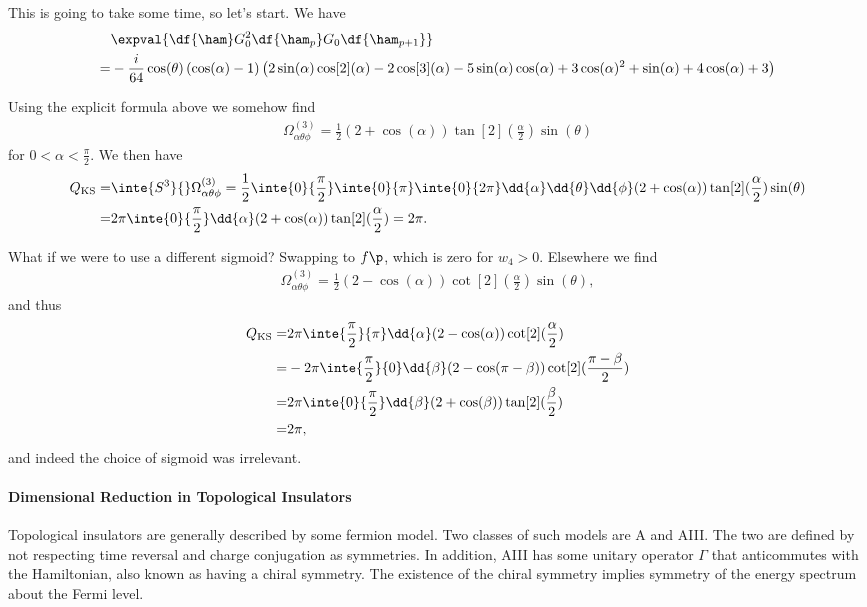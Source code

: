 This is going to take some time, so let's start. We have
\begin{align*}
	 &\expval{\df{\ham}G_{0}^{2}\df{\ham_{p}}G_{0}\df{\ham_{p + 1}}} \\
	=& -\frac{i}{64}\cos(\theta)\left(\cos(\alpha)-1\right) \left(2 \sin(\alpha)\cos[2](\alpha) - 2\cos[3](\alpha) - 5 \sin(\alpha)\cos(\alpha) + 3\cos(\alpha)^{2} + \sin(\alpha) + 4\cos(\alpha) + 3\right)
\end{align*}

Using the explicit formula above we somehow find
\begin{align*}
	\Omega^{(3)}_{\alpha\theta\phi} = \frac{1}{2}(2 + \cos(\alpha))\tan[2](\frac{\alpha}{2})\sin(\theta)
\end{align*}
for $0 < \alpha < \frac{\pi}{2}$. We then have
\begin{align*}
	Q_{\text{KS}} =& \inte{S^{3}}{}\Omega^{(3)}_{\alpha\theta\phi} = \frac{1}{2}\inte{0}{\frac{\pi}{2}}\inte{0}{\pi}\inte{0}{2\pi}\dd{\alpha}\dd{\theta}\dd{\phi}(2 + \cos(\alpha))\tan[2](\frac{\alpha}{2})\sin(\theta) \\
	              =& 2\pi\inte{0}{\frac{\pi}{2}}\dd{\alpha}(2 + \cos(\alpha))\tan[2](\frac{\alpha}{2}) = 2\pi.
\end{align*}

What if we were to use a different sigmoid? Swapping to $f\p$, which is zero for $w_{4} > 0$. Elsewhere we find
\begin{align*}
	\Omega^{(3)}_{\alpha\theta\phi} = \frac{1}{2}(2 - \cos(\alpha))\cot[2](\frac{\alpha}{2})\sin(\theta),
\end{align*}
and thus
\begin{align*}
	Q_{\text{KS}} =& 2\pi\inte{\frac{\pi}{2}}{\pi}\dd{\alpha}(2 - \cos(\alpha))\cot[2](\frac{\alpha}{2}) \\
	              =& -2\pi\inte{\frac{\pi}{2}}{0}\dd{\beta}(2 - \cos(\pi - \beta))\cot[2](\frac{\pi - \beta}{2}) \\
	              =& 2\pi\inte{0}{\frac{\pi}{2}}\dd{\beta}(2 + \cos(\beta))\tan[2](\frac{\beta}{2}) \\
	              =& 2\pi,
\end{align*}
and indeed the choice of sigmoid was irrelevant.

\paragraph{Dimensional Reduction in Topological Insulators}
Topological insulators are generally described by some fermion model. Two classes of such models are A and AIII. The two are defined by not respecting time reversal and charge conjugation as symmetries. In addition, AIII has some unitary operator $\Gamma$ that anticommutes with the Hamiltonian, also known as having a chiral symmetry. The existence of the chiral symmetry implies symmetry of the energy spectrum about the Fermi level.

